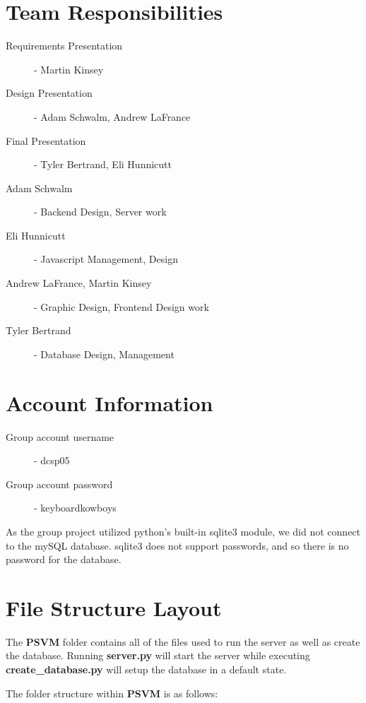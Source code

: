 \documentclass[12pt]{scrartcl}
\begin{document}


\section{Team Responsibilities}

\begin{description}
\item [Requirements Presentation] - Martin Kinsey
\item [Design Presentation] - Adam Schwalm, Andrew LaFrance
\item [Final Presentation] - Tyler Bertrand, Eli Hunnicutt
\vspace{4mm}
\item [Adam Schwalm] - Backend Design, Server work
\item [Eli Hunnicutt] - Javascript Management, Design
\item [Andrew LaFrance, Martin Kinsey] - Graphic Design, Frontend Design work
\item [Tyler Bertrand] - Database Design, Management
\end{description}

\section{Account Information}

\begin{description}
\item [Group account username] - dcsp05
\item [Group account password] - keyboardkowboys
\end{description}

As the group project utilized python's built-in sqlite3 module, we did not connect
to the mySQL database. sqlite3 does not support passwords, and so there is no
password for the database.

\section{File Structure Layout}

The {\bfseries PSVM} folder contains all of the files used to run the server
as well as create the database. Running {\bfseries server.py} will start the
server while executing {\bfseries create\_database.py} will setup the database
in a default state.

The folder structure within {\bfseries PSVM} is as follows:
\end{document}
